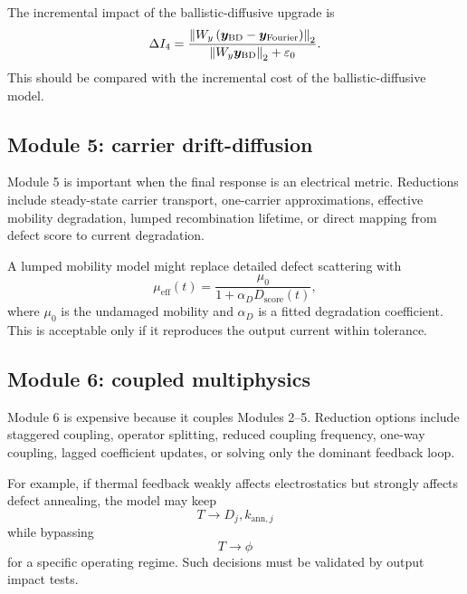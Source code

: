 \documentclass[11pt]{article}
\begin{document}
The incremental impact of the ballistic-diffusive upgrade is
\begin{equation}
    \Delta I_4
    =
    \frac{\norm{W_y\left(\bm{y}_{\mathrm{BD}}-\bm{y}_{\mathrm{Fourier}}\right)}_2}
    {\norm{W_y\bm{y}_{\mathrm{BD}}}_2+\varepsilon_0}.
    \label{eq:thermal_bd_impact}
\end{equation}
This should be compared with the incremental cost of the ballistic-diffusive model.

\subsection{Module 5: carrier drift-diffusion}
Module 5 is important when the final response is an electrical metric. Reductions include steady-state carrier transport, one-carrier approximations, effective mobility degradation, lumped recombination lifetime, or direct mapping from defect score to current degradation.

A lumped mobility model might replace detailed defect scattering with
\begin{equation}
    \mu_{\mathrm{eff}}(t)
    =
    \frac{\mu_0}{1+\alpha_D D_{\mathrm{score}}(t)},
    \label{eq:lumped_mobility_model}
\end{equation}
where \(\mu_0\) is the undamaged mobility and \(\alpha_D\) is a fitted degradation coefficient. This is acceptable only if it reproduces the output current within tolerance.

\subsection{Module 6: coupled multiphysics}
Module 6 is expensive because it couples Modules 2--5. Reduction options include staggered coupling, operator splitting, reduced coupling frequency, one-way coupling, lagged coefficient updates, or solving only the dominant feedback loop.

For example, if thermal feedback weakly affects electrostatics but strongly affects defect annealing, the model may keep
\begin{equation}
    T \to D_j,k_{\mathrm{ann},j}
    \label{eq:thermal_to_defect_keep}
\end{equation}
while bypassing
\begin{equation}
    T \to \phi
    \label{eq:thermal_to_potential_bypass}
\end{equation}
for a specific operating regime. Such decisions must be validated by output impact tests.
\end{document}
